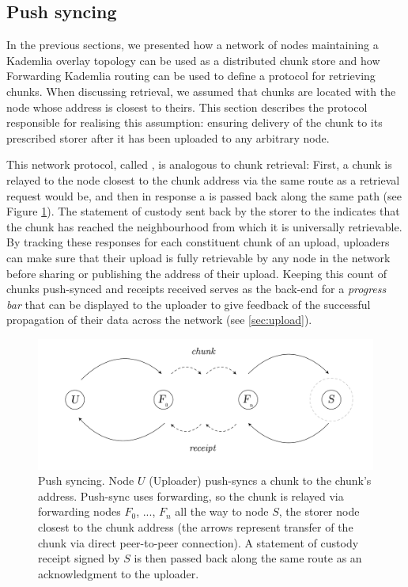 \subsection{Push syncing\statusgreen}\label{sec:push-syncing}
 
In the previous sections, we presented how a network of nodes maintaining a Kademlia overlay topology can be used as a distributed chunk store and how Forwarding Kademlia routing can be used to define a protocol for retrieving chunks.
When discussing retrieval, we assumed that chunks are located with the node whose address is closest to theirs. This section describes the protocol responsible for realising this assumption: ensuring delivery of the chunk to its prescribed storer after it has been uploaded to any arbitrary node.

This network protocol, called , is analogous to chunk retrieval: First, a chunk is relayed to the node closest to the chunk address via the same route as a retrieval request would be, and then in response a  is passed back along the same path (see Figure \ref{fig:push-syncing}). The statement of custody sent back by the storer to the  indicates that the chunk has reached the neighbourhood from which it is universally retrievable. By tracking these responses for each constituent chunk of an upload, uploaders can make sure that their upload is fully retrievable by any node in the network before sharing or publishing the address of their upload. Keeping this count of chunks push-synced and receipts received serves as the back-end for a \emph{progress bar} that can be displayed to the uploader to give feedback of the successful propagation of their data across the network (see \ref{sec:upload}).


\begin{figure}[htbp]
   \centering
   \includegraphics[width=\textwidth]{fig/push-sync.pdf}
   \caption[Push syncing \statusgreen]{Push syncing. Node $U$ (Uploader) push-syncs a chunk to the chunk's address. Push-sync uses forwarding, so the chunk is relayed via forwarding nodes $F_0$, ..., $F_n$ all the way to node $S$, the storer node closest to the chunk address (the arrows represent transfer of the chunk  via direct peer-to-peer connection). A statement of custody receipt signed by $S$ is then passed back along the same route as an acknowledgment to the uploader.}
   \label{fig:push-syncing}
\end{figure}


